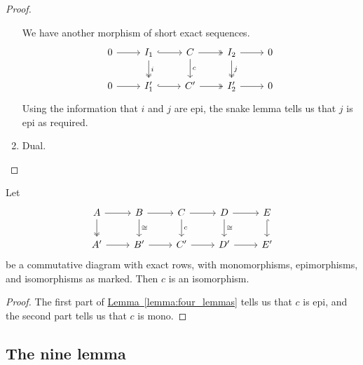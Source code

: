 \documentclass[main.tex]{subfiles}
\begin{document}
\begin{proof}
\begin{enumerate}
      We have another morphism of short exact sequences.
      \begin{equation*}
        \begin{tikzcd}
          0
          \arrow[r]
          & I_{1}
          \arrow[r, hook]
          \arrow[d, two heads, "i"]
          & C
          \arrow[r, two heads]
          \arrow[d, "c"]
          & I_{2}
          \arrow[r]
          \arrow[d, two heads, "j"]
          & 0
          \\
          0
          \arrow[r]
          & I_{1}'
          \arrow[r, hook]
          & C'
          \arrow[r, two heads]
          & I_{2}'
          \arrow[r]
          & 0
        \end{tikzcd}
      \end{equation*}
      Using the information that $i$ and $j$ are epi, the snake lemma tells us that $j$ is epi as required.

    \item Dual.
  \end{enumerate}
\end{proof}
\begin{theorem}
  \label{thm:five_lemma}
  Let
  \begin{equation*}
    \begin{tikzcd}
      A
      \arrow[r]
      \arrow[d, two heads]
      & B
      \arrow[r]
      \arrow[d, "\cong"]
      & C
      \arrow[r]
      \arrow[d, "c"]
      & D
      \arrow[r]
      \arrow[d, "\cong"]
      & E
      \arrow[d, hook]
      \\
      A'
      \arrow[r]
      & B'
      \arrow[r]
      & C'
      \arrow[r]
      & D'
      \arrow[r]
      & E'
    \end{tikzcd}
  \end{equation*}
  be a commutative diagram with exact rows, with monomorphisms, epimorphisms, and isomorphisms as marked. Then $c$ is an isomorphism.
\end{theorem}
\begin{proof}
  The first part of \hyperref[lemma:four_lemmas]{Lemma~\ref*{lemma:four_lemmas}} tells us that $c$ is epi, and the second part tells us that $c$ is mono.
\end{proof}

\subsection{The nine lemma}
\label{ssc:the_nine_lemma}
\end{document}
